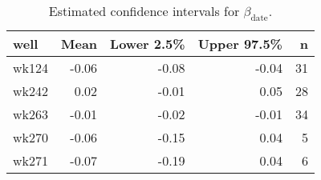 \begin{table}[ht]
\centering
\begin{tabular}{lrrrr}
  \hline
well & Mean & Lower 2.5\% & Upper 97.5\% & n \\ 
  \hline
wk124 & -0.06 & -0.08 & -0.04 &  31 \\ 
  wk242 & 0.02 & -0.01 & 0.05 &  28 \\ 
  wk263 & -0.01 & -0.02 & -0.01 &  34 \\ 
  wk270 & -0.06 & -0.15 & 0.04 &   5 \\ 
  wk271 & -0.07 & -0.19 & 0.04 &   6 \\ 
   \hline
\end{tabular}
\caption{Estimated confidence intervals for $\beta_\text{date}$.} 
\label{tab:beta_date}
\end{table}
